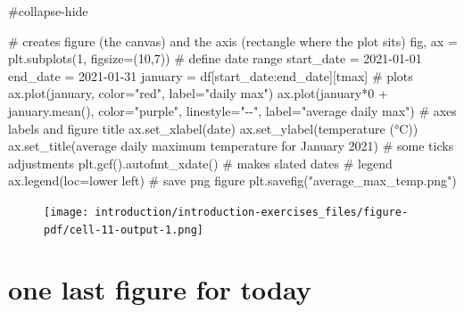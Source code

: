 \documentclass[
  letterpaper,
  DIV=11,
  numbers=noendperiod]{scrreprt}
\newenvironment{Shaded}{\begin{snugshade}}{\end{snugshade}}
\newcommand{\CommentTok}[1]{\textcolor[rgb]{0.37,0.37,0.37}{#1}}
\newcommand{\DecValTok}[1]{\textcolor[rgb]{0.68,0.00,0.00}{#1}}
\newcommand{\NormalTok}[1]{\textcolor[rgb]{0.00,0.23,0.31}{#1}}
\newcommand{\OperatorTok}[1]{\textcolor[rgb]{0.37,0.37,0.37}{#1}}
\newcommand{\StringTok}[1]{\textcolor[rgb]{0.13,0.47,0.30}{#1}}
\begin{document}
\begin{Shaded}
\begin{Highlighting}[]
\CommentTok{\#collapse{-}hide}

\CommentTok{\# creates figure (the canvas) and the axis (rectangle where the plot sits)}
\NormalTok{fig, ax }\OperatorTok{=}\NormalTok{ plt.subplots(}\DecValTok{1}\NormalTok{, figsize}\OperatorTok{=}\NormalTok{(}\DecValTok{10}\NormalTok{,}\DecValTok{7}\NormalTok{))}
\CommentTok{\# define date range}
\NormalTok{start\_date }\OperatorTok{=} \StringTok{\textquotesingle{}2021{-}01{-}01\textquotesingle{}}
\NormalTok{end\_date }\OperatorTok{=} \StringTok{\textquotesingle{}2021{-}01{-}31\textquotesingle{}}
\NormalTok{january }\OperatorTok{=}\NormalTok{ df[start\_date:end\_date][}\StringTok{\textquotesingle{}tmax\textquotesingle{}}\NormalTok{]}
\CommentTok{\# plots}
\NormalTok{ax.plot(january, color}\OperatorTok{=}\StringTok{"red"}\NormalTok{, label}\OperatorTok{=}\StringTok{"daily max"}\NormalTok{)}
\NormalTok{ax.plot(january}\OperatorTok{*}\DecValTok{0} \OperatorTok{+}\NormalTok{ january.mean(), color}\OperatorTok{=}\StringTok{"purple"}\NormalTok{, linestyle}\OperatorTok{=}\StringTok{"{-}{-}"}\NormalTok{, label}\OperatorTok{=}\StringTok{"average daily max"}\NormalTok{)}
\CommentTok{\# axes labels and figure title}
\NormalTok{ax.set\_xlabel(}\StringTok{\textquotesingle{}date\textquotesingle{}}\NormalTok{)}
\NormalTok{ax.set\_ylabel(}\StringTok{\textquotesingle{}temperature (°C)\textquotesingle{}}\NormalTok{)}
\NormalTok{ax.set\_title(}\StringTok{\textquotesingle{}average daily maximum temperature for January 2021\textquotesingle{}}\NormalTok{)}
\CommentTok{\# some ticks adjustments}
\NormalTok{plt.gcf().autofmt\_xdate()  }\CommentTok{\# makes slated dates}
\CommentTok{\# legend}
\NormalTok{ax.legend(loc}\OperatorTok{=}\StringTok{\textquotesingle{}lower left\textquotesingle{}}\NormalTok{)}
\CommentTok{\# save png figure}
\NormalTok{plt.savefig(}\StringTok{"average\_max\_temp.png"}\NormalTok{)}
\end{Highlighting}
\end{Shaded}

\begin{figure}[H]

{\centering \texttt{[image: introduction/introduction-exercises\_files/figure-pdf/cell-11-output-1.png]}

}

\end{figure}

\hypertarget{one-last-figure-for-today}{%
\section{one last figure for today}\label{one-last-figure-for-today}}
\end{document}
